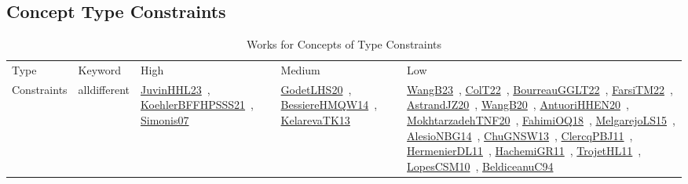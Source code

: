 \clearpage
\subsection{Concept Type Constraints}
\label{sec:Constraints}
{\scriptsize
\begin{longtable}{lp{3cm}>{\raggedright\arraybackslash}p{6cm}>{\raggedright\arraybackslash}p{6cm}>{\raggedright\arraybackslash}p{8cm}}
\rowcolor{white}\caption{Works for Concepts of Type Constraints}\\ \toprule
\rowcolor{white}Type & Keyword & High & Medium & Low\\ \midrule\endhead
\bottomrule
\endfoot
Constraints & alldifferent & \href{works/JuvinHHL23.pdf}{JuvinHHL23}~\cite{JuvinHHL23}, \href{works/KoehlerBFFHPSSS21.pdf}{KoehlerBFFHPSSS21}~\cite{KoehlerBFFHPSSS21}, \href{works/Simonis07.pdf}{Simonis07}~\cite{Simonis07} & \href{works/GodetLHS20.pdf}{GodetLHS20}~\cite{GodetLHS20}, \href{works/BessiereHMQW14.pdf}{BessiereHMQW14}~\cite{BessiereHMQW14}, \href{works/KelarevaTK13.pdf}{KelarevaTK13}~\cite{KelarevaTK13} & \href{works/WangB23.pdf}{WangB23}~\cite{WangB23}, \href{works/ColT22.pdf}{ColT22}~\cite{ColT22}, \href{works/BourreauGGLT22.pdf}{BourreauGGLT22}~\cite{BourreauGGLT22}, \href{works/FarsiTM22.pdf}{FarsiTM22}~\cite{FarsiTM22}, \href{works/AstrandJZ20.pdf}{AstrandJZ20}~\cite{AstrandJZ20}, \href{works/WangB20.pdf}{WangB20}~\cite{WangB20}, \href{works/AntuoriHHEN20.pdf}{AntuoriHHEN20}~\cite{AntuoriHHEN20}, \href{works/MokhtarzadehTNF20.pdf}{MokhtarzadehTNF20}~\cite{MokhtarzadehTNF20}, \href{works/FahimiOQ18.pdf}{FahimiOQ18}~\cite{FahimiOQ18}, \href{works/MelgarejoLS15.pdf}{MelgarejoLS15}~\cite{MelgarejoLS15}, \href{works/AlesioNBG14.pdf}{AlesioNBG14}~\cite{AlesioNBG14}, \href{works/ChuGNSW13.pdf}{ChuGNSW13}~\cite{ChuGNSW13}, \href{works/ClercqPBJ11.pdf}{ClercqPBJ11}~\cite{ClercqPBJ11}, \href{works/HermenierDL11.pdf}{HermenierDL11}~\cite{HermenierDL11}, \href{works/HachemiGR11.pdf}{HachemiGR11}~\cite{HachemiGR11}, \href{works/TrojetHL11.pdf}{TrojetHL11}~\cite{TrojetHL11}, \href{works/LopesCSM10.pdf}{LopesCSM10}~\cite{LopesCSM10}, \href{works/BeldiceanuC94.pdf}{BeldiceanuC94}~\cite{BeldiceanuC94}\\

\end{longtable}}
